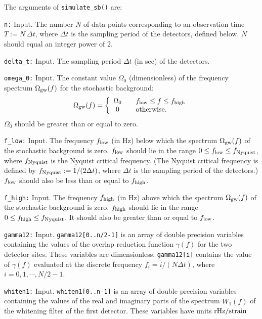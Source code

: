 The arguments of {\tt simulate\_sb()} are:
\begin{description}
%
\item{\tt n:} Input. 
The number $N$ of data points corresponding to an observation
time $T:=N\ \Delta t$, where
$\Delta t$ is the sampling period of the detectors, defined below.
$N$ should equal an integer power of 2.
%
\item{\tt delta\_t:} Input.  
The sampling period $\Delta t$ (in sec) of the detectors. 
%
\item{\tt omega\_0:} Input.  
The constant value $\Omega_0$ (dimensionless) of the frequency 
spectrum $\Omega_{\rm gw}(f)$ for the stochastic background:
%
\[
\Omega_{\rm gw}(f)=\left\{
\begin{array}{cl}
\Omega_0 & \quad f_{\rm low}\le f \le f_{\rm high}\\
0        & \quad {\rm otherwise.}
\end{array}
\right.
\]
%
$\Omega_0$ should be greater than or equal to zero.
%
\item{\tt f\_low:} Input.  
The frequency $f_{\rm low}$ (in Hz) below which the spectrum 
$\Omega_{\rm gw}(f)$ of the stochastic background is zero.
$f_{\rm low}$ should lie in the range $0\le f_{\rm low}\le f_{\rm Nyquist}$, 
where $f_{\rm Nyquist}$ is the Nyquist critical frequency. 
(The Nyquist critical frequency is defined by 
$f_{\rm Nyquist}:=1/(2\Delta t)$, 
where $\Delta t$ is the sampling period of the detectors.)
$f_{\rm low}$ should also be less than or equal to $f_{\rm high}$.
%
\item{\tt f\_high:} Input.  
The frequency $f_{\rm high}$ (in Hz) above which the spectrum 
$\Omega_{\rm gw}(f)$ of the stochastic background is zero.
$f_{\rm high}$ should lie in the range $0\le f_{\rm high}\le f_{\rm Nyquist}$.
It should also be greater than or equal to $f_{\rm low}$.
%
\item{\tt gamma12:} Input.
{\tt gamma12[0..n/2-1]} is an array of double precision variables 
containing the values of the overlap reduction function $\gamma(f)$ 
for the two detector sites.
These variables are dimensionless.
{\tt gamma12[i]} contains the value of $\gamma(f)$ evaluated at the 
discrete frequency $f_i=i/(N\Delta t)$, where $i=0,1,\cdots,N/2-1$.
%
\item{\tt whiten1:} Input.
{\tt whiten1[0..n-1]} is an array of double precision variables 
containing the values of the real and imaginary parts of the spectrum 
$\tilde W_1(f)$ of the whitening filter of the first detector.
These variables have units ${\rm rHz}/{\rm strain}$ 

\end{description}
